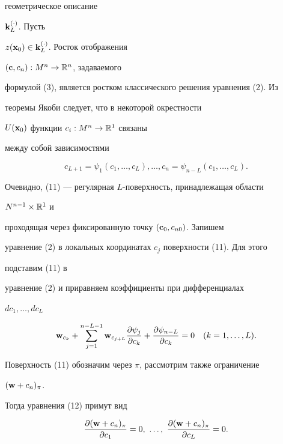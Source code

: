 геометрическое описание


$\bold k^{(\cdot)}_L$. Пусть


$z(\bold x_0)\in\bold k^{(\cdot)}_L$. Росток отображения


$(\bold c,c_n):M^n\to\Bbb R^n$, задаваемого


формулой (3), является ростком классического решения уравнения (2). Из


теоремы Якоби следует, что в некоторой окрестности


$U(\bold x_0)$ функции $c_i:M^n\to\Bbb R^1$ связаны


между собой зависимостями


\begin{equation}


c_{L+1}=\psi_1(c_1,\dotsc,c_L),\dotsc,c_n=


\psi_{n-L}(c_1,\dotsc,c_L).


\end{equation}





Очевидно, (11) --- регулярная $L$-поверхность, принадлежащая области


$N^{n-1}\times\Bbb R^1$ и


проходящая через фиксированную точку $(\bold c_0,c_{n0})$. Запишем


уравнение (2) в локальных координатах $c_j$ поверхности (11). Для этого


подставим (11) в


уравнение (2) и приравняем коэффициенты при дифференциалах


$dc_1,\dotsc,dc_L$


\begin{equation}


\bold w_{c_k}+\sum^{n-L-1}_{j=1}


\bold w_{c_{j+L}}\frac{\partial\psi_j}{\partial c_k}+


\frac{\partial\psi_{n-L}}{\partial c_k}=0\quad


(k=1,\dotsc,L).


\end{equation}


Поверхность (11) обозначим через $\pi$, рассмотрим также ограничение


$(\bold w+c_n)_\pi$.


Тогда уравнения (12) примут вид


\begin{equation}


\frac{\partial(\bold w+c_n)_\pi}{\partial c_1}=0, \ \dotsc, \


\frac{\partial(\bold w+c_n)_\pi}{\partial c_L}=0.


\end{equation}


